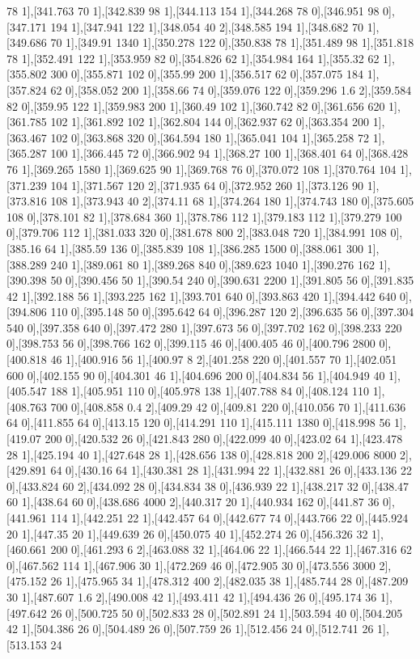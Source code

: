 {78 1],[341.763 70 1],[342.839 98 1],[344.113 154 1],[344.268 78 0],[346.951 98 0],[347.171 194 1],[347.941 122 1],[348.054 40 2],[348.585 194 1],[348.682 70 1],[349.686 70 1],[349.91 1340 1],[350.278 122 0],[350.838 78 1],[351.489 98 1],[351.818 78 1],[352.491 122 1],[353.959 82 0],[354.826 62 1],[354.984 164 1],[355.32 62 1],[355.802 300 0],[355.871 102 0],[355.99 200 1],[356.517 62 0],[357.075 184 1],[357.824 62 0],[358.052 200 1],[358.66 74 0],[359.076 122 0],[359.296 1.6 2],[359.584 82 0],[359.95 122 1],[359.983 200 1],[360.49 102 1],[360.742 82 0],[361.656 620 1],[361.785 102 1],[361.892 102 1],[362.804 144 0],[362.937 62 0],[363.354 200 1],[363.467 102 0],[363.868 320 0],[364.594 180 1],[365.041 104 1],[365.258 72 1],[365.287 100 1],[366.445 72 0],[366.902 94 1],[368.27 100 1],[368.401 64 0],[368.428 76 1],[369.265 1580 1],[369.625 90 1],[369.768 76 0],[370.072 108 1],[370.764 104 1],[371.239 104 1],[371.567 120 2],[371.935 64 0],[372.952 260 1],[373.126 90 1],[373.816 108 1],[373.943 40 2],[374.11 68 1],[374.264 180 1],[374.743 180 0],[375.605 108 0],[378.101 82 1],[378.684 360 1],[378.786 112 1],[379.183 112 1],[379.279 100 0],[379.706 112 1],[381.033 320 0],[381.678 800 2],[383.048 720 1],[384.991 108 0],[385.16 64 1],[385.59 136 0],[385.839 108 1],[386.285 1500 0],[388.061 300 1],[388.289 240 1],[389.061 80 1],[389.268 840 0],[389.623 1040 1],[390.276 162 1],[390.398 50 0],[390.456 50 1],[390.54 240 0],[390.631 2200 1],[391.805 56 0],[391.835 42 1],[392.188 56 1],[393.225 162 1],[393.701 640 0],[393.863 420 1],[394.442 640 0],[394.806 110 0],[395.148 50 0],[395.642 64 0],[396.287 120 2],[396.635 56 0],[397.304 540 0],[397.358 640 0],[397.472 280 1],[397.673 56 0],[397.702 162 0],[398.233 220 0],[398.753 56 0],[398.766 162 0],[399.115 46 0],[400.405 46 0],[400.796 2800 0],[400.818 46 1],[400.916 56 1],[400.97 8 2],[401.258 220 0],[401.557 70 1],[402.051 600 0],[402.155 90 0],[404.301 46 1],[404.696 200 0],[404.834 56 1],[404.949 40 1],[405.547 188 1],[405.951 110 0],[405.978 138 1],[407.788 84 0],[408.124 110 1],[408.763 700 0],[408.858 0.4 2],[409.29 42 0],[409.81 220 0],[410.056 70 1],[411.636 64 0],[411.855 64 0],[413.15 120 0],[414.291 110 1],[415.111 1380 0],[418.998 56 1],[419.07 200 0],[420.532 26 0],[421.843 280 0],[422.099 40 0],[423.02 64 1],[423.478 28 1],[425.194 40 1],[427.648 28 1],[428.656 138 0],[428.818 200 2],[429.006 8000 2],[429.891 64 0],[430.16 64 1],[430.381 28 1],[431.994 22 1],[432.881 26 0],[433.136 22 0],[433.824 60 2],[434.092 28 0],[434.834 38 0],[436.939 22 1],[438.217 32 0],[438.47 60 1],[438.64 60 0],[438.686 4000 2],[440.317 20 1],[440.934 162 0],[441.87 36 0],[441.961 114 1],[442.251 22 1],[442.457 64 0],[442.677 74 0],[443.766 22 0],[445.924 20 1],[447.35 20 1],[449.639 26 0],[450.075 40 1],[452.274 26 0],[456.326 32 1],[460.661 200 0],[461.293 6 2],[463.088 32 1],[464.06 22 1],[466.544 22 1],[467.316 62 0],[467.562 114 1],[467.906 30 1],[472.269 46 0],[472.905 30 0],[473.556 3000 2],[475.152 26 1],[475.965 34 1],[478.312 400 2],[482.035 38 1],[485.744 28 0],[487.209 30 1],[487.607 1.6 2],[490.008 42 1],[493.411 42 1],[494.436 26 0],[495.174 36 1],[497.642 26 0],[500.725 50 0],[502.833 28 0],[502.891 24 1],[503.594 40 0],[504.205 42 1],[504.386 26 0],[504.489 26 0],[507.759 26 1],[512.456 24 0],[512.741 26 1],[513.153 24 }
